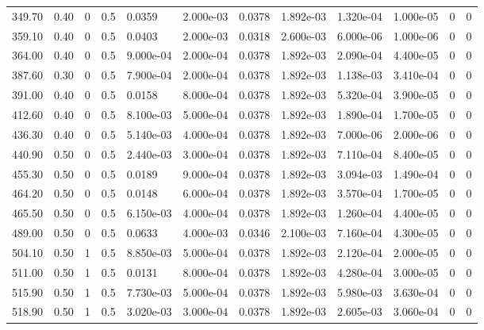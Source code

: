 \documentclass[preview]{standalone}
\begin{document}
{{\begin{tabular}{L{1.2cm}C{1.2cm} C{0.3cm}C{0.5cm} C{1.4cm}C{1.4cm} C{1.4cm}C{1.4cm} C{1.6cm}C{1.6cm} C{1.6cm}C{1.6cm}}
  349.70  &  0.40  & 0     & 0.5 &  0.0359  & 2.000e-03  &  0.0378&   1.892e-03& 1.320e-04 & 1.000e-05   &  0 & 0  \\ 
  359.10  &  0.40  & 0     & 0.5 &  0.0403  & 2.000e-03  &  0.0318&   2.600e-03& 6.000e-06 & 1.000e-06   &  0 & 0  \\ 
  364.00  &  0.40  & 0     & 0.5 &  9.000e-04  & 2.000e-04  &  0.0378&   1.892e-03& 2.090e-04 & 4.400e-05   &  0 & 0  \\ 
  387.60  &  0.30  & 0     & 0.5 &  7.900e-04  & 2.000e-04  &  0.0378&   1.892e-03& 1.138e-03 & 3.410e-04   &  0 & 0  \\ 
  391.00  &  0.40  & 0     & 0.5 &  0.0158  & 8.000e-04  &  0.0378&   1.892e-03& 5.320e-04 & 3.900e-05   &  0 & 0  \\ 
  412.60  &  0.40  & 0     & 0.5 &  8.100e-03  & 5.000e-04  &  0.0378&   1.892e-03& 1.890e-04 & 1.700e-05   &  0 & 0  \\ 
  436.30  &  0.40  & 0     & 0.5 &  5.140e-03  & 4.000e-04  &  0.0378&   1.892e-03& 7.000e-06 & 2.000e-06   &  0 & 0  \\ 
  440.90  &  0.50  & 0     & 0.5 &  2.440e-03  & 3.000e-04  &  0.0378&   1.892e-03& 7.110e-04 & 8.400e-05   &  0 & 0  \\ 
  455.30  &  0.50  & 0     & 0.5 &  0.0189  & 9.000e-04  &  0.0378&   1.892e-03& 3.094e-03 & 1.490e-04   &  0 & 0  \\ 
  464.20  &  0.50  & 0     & 0.5 &  0.0148  & 6.000e-04  &  0.0378&   1.892e-03& 3.570e-04 & 1.700e-05   &  0 & 0  \\ 
  465.50  &  0.50  & 0     & 0.5 &  6.150e-03  & 4.000e-04  &  0.0378&   1.892e-03& 1.260e-04 & 4.400e-05   &  0 & 0  \\ 
  489.00  &  0.50  & 0     & 0.5 &  0.0633  & 4.000e-03  &  0.0346&   2.100e-03& 7.160e-04 & 4.300e-05   &  0 & 0  \\ 
  504.10  &  0.50  & 1     & 0.5 &  8.850e-03  & 5.000e-04  &  0.0378&   1.892e-03& 2.120e-04 & 2.000e-05   &  0 & 0  \\ 
  511.00  &  0.50  & 1     & 0.5 &  0.0131  & 8.000e-04  &  0.0378&   1.892e-03& 4.280e-04 & 3.000e-05   &  0 & 0  \\ 
  515.90  &  0.50  & 1     & 0.5 &  7.730e-03  & 5.000e-04  &  0.0378&   1.892e-03& 5.980e-03 & 3.630e-04   &  0 & 0  \\ 
  518.90  &  0.50  & 1     & 0.5 &  3.020e-03  & 3.000e-04  &  0.0378&   1.892e-03& 2.605e-03 & 3.060e-04   &  0 & 0  \\ 
\hline 
\end{tabular} 

}}
\end{document}
